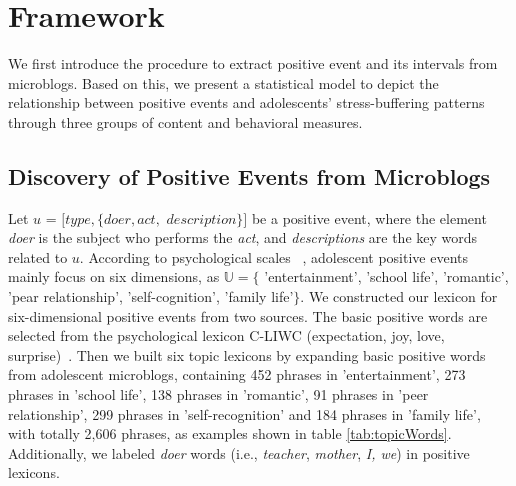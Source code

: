 \section{Framework}
\label{sec:frame}
We first introduce the procedure to extract positive event and its intervals from microblogs.
Based on this,
we present a statistical model to depict
the relationship between positive events and adolescents' stress-buffering patterns through three groups of content and behavioral measures.
\subsection{Discovery of Positive Events from Microblogs}
\label{sec:frame1}
Let $u$ = $[type,\{doer, act,$ $description\}]$ be a positive event,
where the element \emph{doer} is the subject who performs the \emph{act},
and \emph{descriptions} are the key words related to $u$.
According to psychological scales ~\citep{Jun2008Influence,hassles},
adolescent positive events mainly focus on six dimensions,
as $\mathbb{U} =\{$ 'entertainment', 'school life', 'romantic', 'pear relationship', 'self-cognition', 'family life'$\}$. We constructed our lexicon for six-dimensional positive events from two sources.
The basic positive words are selected from the psychological lexicon C-LIWC (expectation, joy, love, surprise)~\citep{Tausczik2010The}.
Then we built six topic lexicons by expanding basic positive words from adolescent microblogs,
containing 452 phrases in 'entertainment',
273 phrases in 'school life',
138 phrases in 'romantic',
91 phrases in 'peer relationship',
299 phrases in 'self-recognition' and 184 phrases in 'family life', with totally 2,606 phrases,
as examples shown in table \ref{tab:topicWords}.
Additionally, we labeled \emph{doer} words (i.e., \emph{teacher}, \emph{mother}, \emph{I, we}) in positive lexicons.

